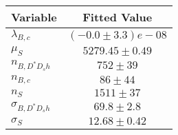 \begin{tabular}[t]{lc}
\hline
Variable &Fitted Value\\
\hline\hline
$\lambda_{B,c}$&$(-0.0\pm3.3)e-08$\\
\hline
$\mu_S$&$5279.45\pm0.49$\\
\hline
$n_{B, D^* D_s h}$&$752\pm39$\\
\hline
$n_{B,c}$&$86\pm44$\\
\hline
$n_S$&$1511\pm37$\\
\hline
$\sigma_{B, D^* D_s h}$&$69.8\pm2.8$\\
\hline
$\sigma_S$&$12.68\pm0.42$\\
\hline
\end{tabular}